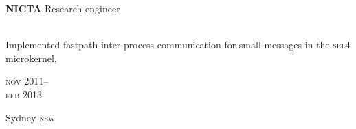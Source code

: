 


\begin{minipage}[t]{0.75\textwidth}
\textbf{NICTA}\phantom{..} Research engineer \\
{\small
\\
Implemented fastpath inter-process communication for small messages in the \textsc{sel4} microkernel.\\
\par
}
\end{minipage}
\begin{minipage}[t]{0.25\textwidth}
{
\hfill \textsc{nov} 2011--\\ 
\hspace*{0pt} \hfill \textsc{feb} 2013
\par
{\small\hfill Sydney \textsc{nsw}}
}
\end{minipage}

